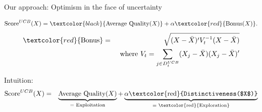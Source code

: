 \documentclass[aspectratio=169,t,11pt,table]{beamer}
\begin{document}
\begin{frame}{Our approach: Optimism in the face of uncertainty} 

  
$$
 \text{Score}^{UCB}(X)=\textcolor{black}{\text{Average Quality}(X)} +\alpha  \textcolor{red}{\text{Bonus}(X)}.
$$
\vspace{-15pt}
\begin{eqnarray*} \textcolor{red}{\text{Bonus}} &=& \sqrt{(X-\bar{X})'V_t^{-1}(X-\bar{X})}\\ 
&&\text{ where } V_t  = \sum_{j \in D^{UCB}_{t}} (X_j-\bar{X})(X_j-\bar{X})'\end{eqnarray*} 
\vspace{-3pt}

\alert{Intuition:}\smallskip
\begin{eqnarray*}
 \text{Score}^{UCB}(X) &=& \underbrace{\text{Average Quality($X$)}}_{=\text{ Exploitation}}+  \underbrace{\alpha\text{\textcolor{red}{Distinctiveness($X$)}}}_{=\text{ \textcolor{red}{Exploration}}} 
\end{eqnarray*}


\end{frame}
\end{document}
